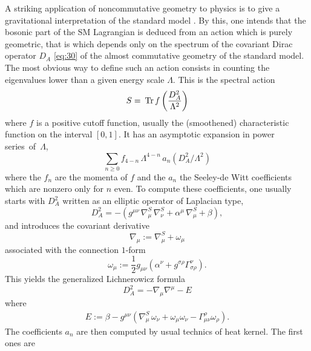 \documentclass[11pt]{article}
\newcommand{\Tr}[1]{\:{\rm Tr}\,#1}
\begin{document}
A striking application of noncommutative geometry to physics is to give a gravitational
interpretation of the standard model \cite{Connes:1996fu}. By this,
one intends that the bosonic part of the SM
Lagrangian is deduced from an action which is purely geometric, that
is which depends only on the spectrum of the covariant Dirac
operator $D_A$ \eqref{eq:30} of the almost commutative geometry
of the standard model. The most obvious way to define such an action consists in
counting the eigenvalues lower than a given energy
scale $\Lambda$. This is the spectral action \cite{Chamseddine:1996kx} 
\begin{equation}
S=\Tr f\left(\frac{D_A^2}{\Lambda^2}\right) 
\label{eq:spectral_action}
\end{equation}
where $f$ is a positive cutoff function, usually the (smoothened)
characteristic function on the interval $[0,1]$.
It has an asymptotic expansion in power series~of~$\Lambda$, 
\begin{equation}
\label{asympexp}
\sum_{n\geq0} f_{4-n}\, \Lambda^{4-n}\, a_n(D_A^2/\Lambda^2)
\end{equation}
where the $f_n$ are the momenta of $f$
and  the $a_n$ the Seeley-de Witt coefficients
which are nonzero only for $n$ even.
To compute these coefficients, one usually starts with $D_A^2$
  written as an elliptic operator of Laplacian type, 
\begin{equation}
\label{laplacian}
D_A^2=-(g^{\mu\nu}\,\nabla_\mu^S\,\nabla_\nu^S +\alpha^\mu\,\nabla^S_\mu+\beta),
\end{equation}
and introduces the covariant derivative
\begin{equation}
  \label{eq:155}
  \nabla_\mu := \nabla^S_\mu +\omega_\mu 
\end{equation}
associated with the connection $1$-form
\begin{equation}
  \label{eq:156}
  \omega_\mu:=\frac12 g_{\mu\nu}\left(\alpha^\nu+g^{\sigma\rho}
  \Gamma^\nu_{\sigma\rho}\right). 
\end{equation}
This yields the generalized Lichnerowicz formula
\begin{equation}
  \label{eq:157}
  D_A^2 = -\nabla_\mu \nabla^\mu -E
\end{equation}
where
\begin{align}
\label{laplawithoutdilaton} E:=\beta-g^{\mu\nu}\left(\nabla^S_\mu\, \omega_\nu+\omega_\mu\omega_\nu-\Gamma^\rho_{\mu\nu}\omega_\rho\right).
\end{align}
The coefficients
$a_n$ are then computed by usual technics of heat kernel. The first ones are \cite{Gilkey1984,Vassilevich:2003fk}
\end{document}

